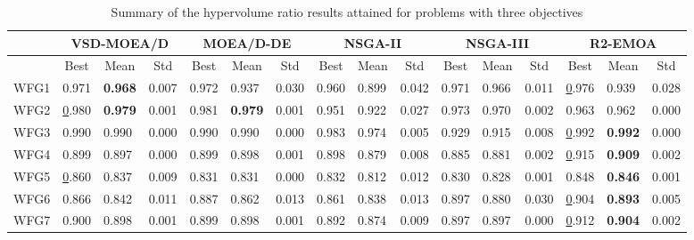\begin{table*}[t]
\caption{Summary of the hypervolume ratio results attained for problems with three objectives}
\label{tab:StatisticsHV_3obj}
\centering
\begin{tabular}{c l|l|l|l|l|l|l|l|l|l|l|l|l|l|l}
\cline{2-16}
 & \multicolumn{3}{c|}{\textbf{VSD-MOEA/D}} & \multicolumn{3}{c|}{\textbf{MOEA/D-DE}} & \multicolumn{3}{c|}{\textbf{NSGA-II}} & \multicolumn{3}{c|}{\textbf{NSGA-III}} & \multicolumn{3}{c}{\textbf{R2-EMOA}} \\ \hline
\multicolumn{1}{c}{} & \multicolumn{1}{c|}{Best} & \multicolumn{1}{c|}{Mean} & \multicolumn{1}{c|}{Std} & \multicolumn{1}{c|}{Best} & \multicolumn{1}{c|}{Mean} & \multicolumn{1}{c|}{Std} & \multicolumn{1}{c|}{Best} & \multicolumn{1}{c|}{Mean} & \multicolumn{1}{c|}{Std} & \multicolumn{1}{c|}{Best} & \multicolumn{1}{c|}{Mean} & \multicolumn{1}{c|}{Std} & \multicolumn{1}{c|}{Best} & \multicolumn{1}{c|}{Mean} & \multicolumn{1}{c}{Std} \\ \hline
\multicolumn{1}{c|}{WFG1} & 0.971 & \textbf{0.968} & 0.007 & 0.972 & 0.937 & 0.030 & 0.960 & 0.899 & 0.042 & 0.971 & 0.966 & 0.011 & {\ul 0.976} & 0.939 & 0.028 \\ \hline
\multicolumn{1}{c|}{WFG2} & {\ul 0.980} & \textbf{0.979} & 0.001 & 0.981 & \textbf{0.979} & 0.001 & 0.951 & 0.922 & 0.027 & 0.973 & 0.970 & 0.002 & 0.963 & 0.962 & 0.000 \\ \hline
\multicolumn{1}{c|}{WFG3} & 0.990 & 0.990 & 0.000 & 0.990 & 0.990 & 0.000 & 0.983 & 0.974 & 0.005 & 0.929 & 0.915 & 0.008 & {\ul 0.992} & \textbf{0.992} & 0.000 \\ \hline
\multicolumn{1}{c|}{WFG4} & 0.899 & 0.897 & 0.000 & 0.899 & 0.898 & 0.001 & 0.898 & 0.879 & 0.008 & 0.885 & 0.881 & 0.002 & {\ul 0.915} & \textbf{0.909} & 0.002 \\ \hline
\multicolumn{1}{c|}{WFG5} & {\ul 0.860} & 0.837 & 0.009 & 0.831 & 0.831 & 0.000 & 0.832 & 0.812 & 0.012 & 0.830 & 0.828 & 0.001 & 0.848 & \textbf{0.846} & 0.001 \\ \hline
\multicolumn{1}{c|}{WFG6} & 0.866 & 0.842 & 0.011 & 0.887 & 0.862 & 0.013 & 0.861 & 0.838 & 0.013 & 0.897 & 0.880 & 0.030 & {\ul 0.904} & \textbf{0.893} & 0.005 \\ \hline
\multicolumn{1}{c|}{WFG7} & 0.900 & 0.898 & 0.001 & 0.899 & 0.898 & 0.001 & 0.892 & 0.874 & 0.009 & 0.897 & 0.897 & 0.000 & {\ul 0.912} & \textbf{0.904} & 0.002 \\ \hline

\end{tabular}
\end{table*}
